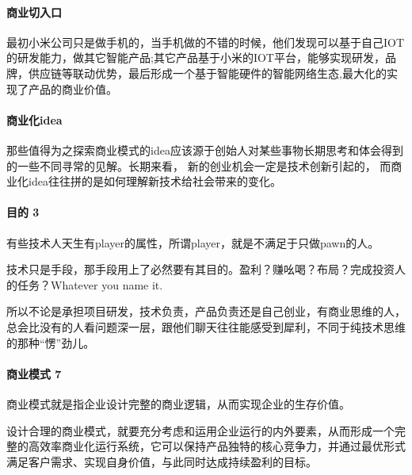 \documentclass[letterpaper,11pt,english]{sphinxmanual}
\begin{document}
\paragraph{商业切入口}
\label{\detokenize{chapter_idea/business:id5}}
最初小米公司只是做手机的，当手机做的不错的时候，他们发现可以基于自己IOT的研发能力，做其它智能产品;其它产品基于小米的IOT平台，能够实现研发，品牌，供应链等联动优势，最后形成一个基于智能硬件的智能网络生态,最大化的实现了产品的商业价值。


\paragraph{商业化idea}
\label{\detokenize{chapter_idea/business:idea}}
那些值得为之探索商业模式的idea应该源于创始人对某些事物长期思考和体会得到的一些不同寻常的见解。长期来看，
新的创业机会一定是技术创新引起的，
而商业化idea往往拼的是如何理解新技术给社会带来的变化。


\paragraph{目的 3\sphinxfootnotemark[122]}
\label{\detokenize{chapter_idea/business:id6}}%
\begin{footnotetext}[122]\sphinxAtStartFootnote
{}
%
\end{footnotetext}\ignorespaces 
有些技术人天生有player的属性，所谓player，就是不满足于只做pawn的人。

技术只是手段，那手段用上了必然要有其目的。盈利？赚吆喝？布局？完成投资人的任务？Whatever
you name it.

所以不论是承担项目研发，技术负责，产品负责还是自己创业，有商业思维的人，总会比没有的人看问题深一层，跟他们聊天往往能感受到犀利，不同于纯技术思维的那种“愣”劲儿。


\paragraph{商业模式 7\sphinxfootnotemark[123]}
\label{\detokenize{chapter_idea/business:id7}}%
\begin{footnotetext}[123]\sphinxAtStartFootnote
{}
%
\end{footnotetext}\ignorespaces 
商业模式就是指企业设计完整的商业逻辑，从而实现企业的生存价值。

设计合理的商业模式，就要充分考虑和运用企业运行的内外要素，从而形成一个完整的高效率商业化运行系统，它可以保持产品独特的核心竞争力，并通过最优形式满足客户需求、实现自身价值，与此同时达成持续盈利的目标。
%
\begin{footnote}[124]\sphinxAtStartFootnote
{}
%
\end{footnote}
\end{document}
